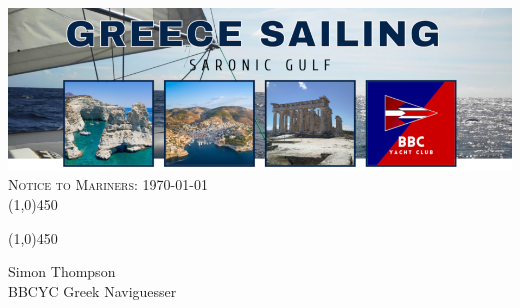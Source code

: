 \documentclass[12pt,a4paper,oneside]{article}
\begin{document}

\begin{center}
\includegraphics[scale=0.5]{../images/saronic_header_small.png} \\[0.2cm]
{\Huge \textsc{Notice to Mariners: \today}}\\
\line(1,0){450}
\end{center}

\begin{multicols}{2}



\end{multicols}

\begin{center}
\line(1,0){450}
\end{center}

\noindent Simon Thompson\\
BBCYC Greek Naviguesser
\end{document}
